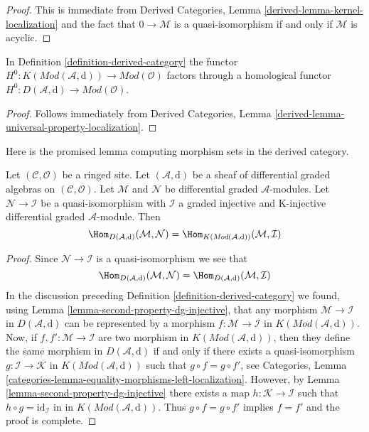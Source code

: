 \begin{proof}
This is immediate from
Derived Categories, Lemma \ref{derived-lemma-kernel-localization}
and the fact that $0 \to \mathcal{M}$ is a quasi-isomorphism
if and only if $\mathcal{M}$ is acyclic.
\end{proof}

\begin{lemma}
\label{lemma-H0-over-D}
In Definition \ref{definition-derived-category} the functor
$H^0 : K(\textit{Mod}(\mathcal{A}, \text{d})) \to
\textit{Mod}(\mathcal{O})$ factors through a homological functor
$H^0 : D(\mathcal{A}, \text{d}) \to \textit{Mod}(\mathcal{O})$.
\end{lemma}

\begin{proof}
Follows immediately from
Derived Categories, Lemma \ref{derived-lemma-universal-property-localization}.
\end{proof}

\noindent
Here is the promised lemma computing morphism sets in the
derived category.

\begin{lemma}
\label{lemma-hom-derived}
Let $(\mathcal{C}, \mathcal{O})$ be a ringed site. Let
$(\mathcal{A}, \text{d})$ be a sheaf of differential graded algebras
on $(\mathcal{C}, \mathcal{O})$.
Let $\mathcal{M}$ and $\mathcal{N}$ be differential graded
$\mathcal{A}$-modules. Let $\mathcal{N} \to \mathcal{I}$ be a
quasi-isomorphism with $\mathcal{I}$ a graded injective and
K-injective differential graded $\mathcal{A}$-module. Then
$$
\Hom_{D(\mathcal{A}, \text{d})}(\mathcal{M}, \mathcal{N}) =
\Hom_{K(\textit{Mod}(\mathcal{A}, \text{d}))}(\mathcal{M}, \mathcal{I})
$$
\end{lemma}

\begin{proof}
Since $\mathcal{N} \to \mathcal{I}$ is a quasi-isomorphism
we see that
$$
\Hom_{D(\mathcal{A}, \text{d})}(\mathcal{M}, \mathcal{N}) =
\Hom_{D(\mathcal{A}, \text{d})}(\mathcal{M}, \mathcal{I})
$$
In the discussion preceding Definition \ref{definition-derived-category}
we found, using Lemma \ref{lemma-second-property-dg-injective},
that any morphism $\mathcal{M} \to \mathcal{I}$
in $D(\mathcal{A}, \text{d})$ can be represented by a morphism
$f : \mathcal{M} \to \mathcal{I}$ in
$K(\textit{Mod}(\mathcal{A}, \text{d}))$.
Now, if $f, f' :  \mathcal{M} \to \mathcal{I}$ are two morphism in
$K(\textit{Mod}(\mathcal{A}, \text{d}))$, then they define
the same morphism in $D(\mathcal{A}, \text{d})$ if and only
if there exists a quasi-isomorphism $g : \mathcal{I} \to \mathcal{K}$
in $K(\textit{Mod}(\mathcal{A}, \text{d}))$
such that $g \circ f = g \circ f'$, see
Categories, Lemma \ref{categories-lemma-equality-morphisms-left-localization}.
However, by Lemma \ref{lemma-second-property-dg-injective} there
exists a map
$h : \mathcal{K} \to \mathcal{I}$
such that $h \circ g = \text{id}_\mathcal{I}$ in
in $K(\textit{Mod}(\mathcal{A}, \text{d}))$.
Thus $g \circ f = g \circ f'$ implies $f = f'$ and
the proof is complete.
\end{proof}

